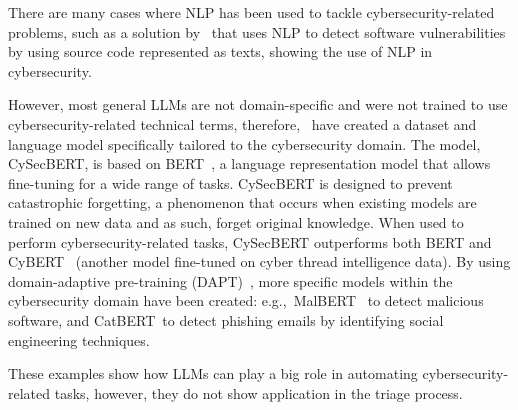 There are many cases where NLP has been used to tackle cybersecurity-related problems, such as a solution
by\ \citet{singh2022cyber} that uses NLP to detect software vulnerabilities by using source code represented as texts,
showing the use of NLP in cybersecurity.

However, most general LLMs are not domain-specific and were not trained to use cybersecurity-related technical terms,
therefore,\ \citet{bayer2024cysecbert} have created a dataset and language model specifically tailored to the
cybersecurity domain.
The model, CySecBERT, is based on BERT\ \citep{devlin2018bert}, a language representation model that allows fine-tuning
for a wide range of tasks.
CySecBERT is designed to prevent catastrophic forgetting, a phenomenon that occurs when existing models are trained on
new data and as such, forget original knowledge.
When used to perform cybersecurity-related tasks, CySecBERT outperforms both BERT and CyBERT\ \citep{ranade2021cybert}
(another model fine-tuned on cyber thread intelligence data).
By using domain-adaptive pre-training (DAPT)\ \citep{gururangan2020don}, more specific models within the cybersecurity
domain have been created: e.g.,\ MalBERT\ \citep{rahali2021malbert} to detect malicious software, and
CatBERT\ \citep{lee2020catbert}to detect phishing emails by identifying social engineering techniques.

These examples show how LLMs can play a big role in automating cybersecurity-related tasks, however, they do not show
application in the triage process.